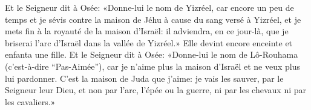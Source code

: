 Et le Seigneur dit à Osée: «Donne-lui le nom de Yizréel,
	car encore un peu de temps et je sévis contre la maison de Jéhu
		à cause du sang versé à Yizréel,
	et je mets fin à la royauté de la maison d’Israël:
	il adviendra, en ce jour-là,
		que je briserai l’arc d’Israël dans la vallée de Yizréel.»
Elle devint encore enceinte et enfanta une fille.
Et le Seigneur dit à Osée: «Donne-lui le nom de Lô-Rouhama (c’est-à-dire “Pas-Aimée”),
	car je n’aime plus la maison d’Israël et ne veux plus lui pardonner.
C’est la maison de Juda que j’aime:
	je vais les sauver, par le Seigneur leur Dieu,
	et non par l’arc, l’épée ou la guerre, ni par les chevaux ni par les cavaliers.»
